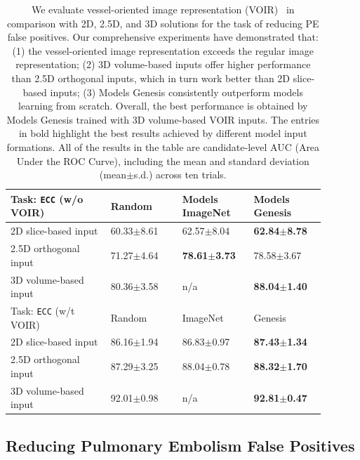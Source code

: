 \begin{table}[t]
\centering
\footnotesize
\caption[Models Genesis with 3D VOIR Perform the Best in PE Detection]{
We evaluate vessel-oriented image representation (VOIR)~\citep{tajbakhsh2019computer} in comparison with 2D, 2.5D, and 3D solutions for the task of reducing PE false positives. Our comprehensive experiments have demonstrated that: (1) the vessel-oriented image representation exceeds the regular image representation; (2) 3D volume-based inputs offer higher performance than 2.5D orthogonal inputs, which in turn work better than 2D slice-based inputs; (3) Models Genesis consistently outperform models learning from scratch. Overall, the best performance is obtained by Models Genesis trained with 3D volume-based VOIR inputs. The entries in bold highlight the best results achieved by different model input formations. All of the results in the table are candidate-level AUC (Area Under the ROC Curve), including the mean and standard deviation (mean$\pm$s.d.) across ten trials.
}
\label{ch6:tab:voir_nonvoir}
\begin{tabular}{p{0.29\linewidth}P{0.2\linewidth}P{0.2\linewidth}P{0.2\linewidth}}
    \hline
    Task: \texttt{ECC} (w/o VOIR) & Random & Models ImageNet & Models Genesis \\
    \hline
    2D slice-based input & 60.33$\pm$8.61 & 62.57$\pm$8.04 & \textbf{62.84$\pm$8.78} \\
    2.5D orthogonal input & 71.27$\pm$4.64 & \textbf{78.61$\pm$3.73} & 78.58$\pm$3.67 \\
    3D volume-based input & 80.36$\pm$3.58 & n/a & \textbf{88.04$\pm$1.40} \\
    \hline
    Task: \texttt{ECC} (w/t VOIR) & Random & ImageNet & Genesis \\
    \hline
    2D slice-based input & 86.16$\pm$1.94 & 86.83$\pm$0.97 & \textbf{87.43$\pm$1.34} \\
    2.5D orthogonal input & 87.29$\pm$3.25 & 88.04$\pm$0.78 & \textbf{88.32$\pm$1.70} \\
    3D volume-based input & 92.01$\pm$0.98 & n/a & \textbf{92.81$\pm$0.47} \\
    \hline
    \end{tabular}
\end{table}


\subsection{Reducing Pulmonary Embolism False Positives}
\label{ch6:medical_applications:false_positive_reduction}


